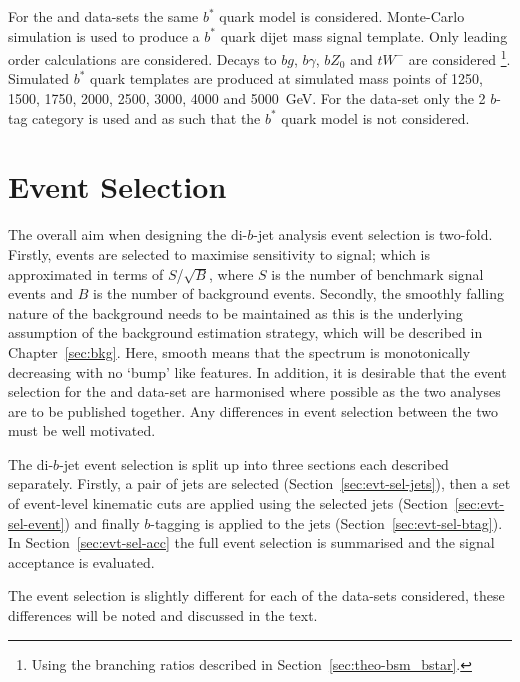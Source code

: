 \begin{itemize}[leftmargin=*]
  For the \summer{} and \hm{}
  data-sets the same $b^*$ quark model is considered.
  Monte-Carlo simulation is used to produce a $b^*$ quark dijet mass signal template.
  Only leading order calculations are considered.
  Decays to $bg$, $b\gamma$, $bZ_0$ and $tW^{-}$ are considered
  \footnote{Using the branching ratios described in Section~\ref{sec:theo-bsm_bstar}.}.
  Simulated $b^*$ quark templates are produced at simulated mass points of
  1250, 1500, 1750, 2000, 2500, 3000, 4000 and 5000~GeV.
  For the \lm{} data-set
  only the 2 $b$-tag category is used
  and as such that the $b^*$ quark model is not considered.
\end{itemize}

\section{Event Selection}
\label{sec:evt-sel}

The overall aim when designing the di-$b$-jet analysis event selection
is two-fold.
Firstly, events are selected to
maximise sensitivity to signal;
which is approximated in terms of $S$/$\sqrt{B}$,
where $S$ is the number of benchmark signal events and $B$ is the number of background events.
Secondly, the smoothly falling nature of the background needs to be maintained
as this is the underlying assumption of the background estimation strategy,
which will be described in Chapter~\ref{sec:bkg}.
Here, smooth means that the spectrum is monotonically decreasing with no `bump' like features.
In addition, it is desirable that the event selection for the
\hm{} and \lm{} data-set are
harmonised where possible as the two analyses are to be published together.
Any differences in event selection between the two must be well motivated.

The di-$b$-jet event selection is split up into three sections each described separately.
Firstly, a pair of jets are selected (Section~\ref{sec:evt-sel-jets}),
then a set of event-level kinematic cuts are applied using the selected jets (Section~\ref{sec:evt-sel-event})
and finally $b$-tagging is applied to the jets (Section~\ref{sec:evt-sel-btag}).
In Section~\ref{sec:evt-sel-acc} the full event selection is summarised and
the signal acceptance is evaluated.

The event selection is slightly different for each of the data-sets considered,
these differences will be noted and discussed in the text.

